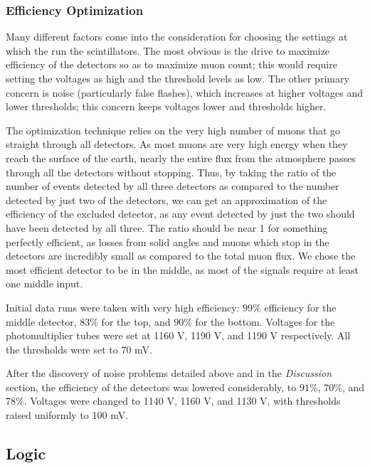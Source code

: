 \subsubsection{Efficiency Optimization}

Many different factors come into the consideration for choosing the settings at which the run the scintillators. The most obvious is the drive to maximize efficiency of the detectors so as to maximize muon count; this would require setting the voltages as high and the threshold levels as low. The other primary concern is noise (particularly false flashes), which increases at higher voltages and lower thresholds; this concern keeps voltages lower and thresholds higher.

The optimization technique relies on the very high number of muons that go straight through all detectors. As most muons are very high energy when they reach the surface of the earth, nearly the entire flux from the atmosphere passes through all the detectors without stopping. Thus, by taking the ratio of the number of events detected by all three detectors as compared to the number detected by just two of the detectors, we can get an approximation of the efficiency of the excluded detector, as any event detected by just the two should have been detected by all three. The ratio should be near 1 for something perfectly efficient, as losses from solid angles and muons which stop in the detectors are incredibly small as compared to the total muon flux. We chose the most efficient detector to be in the middle, as most of the signals require at least one middle input.

Initial data runs were taken with very high efficiency: $99\%$ efficiency for the middle detector, $83\%$ for the top, and $90\%$ for the bottom. Voltages for the photomultiplier tubes were set at 1160 V, 1190 V, and 1190 V respectively. All the thresholds were set to 70 mV. 

After the discovery of noise problems detailed above and in the \emph{Discussion} section, the efficiency of the detectors was lowered considerably, to $91\%$, $70\%$, and $78\%$. Voltages were changed to 1140 V, 1160 V, and 1130 V, with thresholds raised uniformly to 100 mV.

\subsection{Logic}

